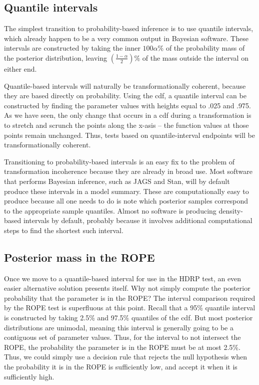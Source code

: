 \documentclass[man]{apa}
\newcommand{\hdr}{HDRP}
\begin{document}
\subsection*{Quantile intervals}

The simplest transition to probability-based inference is to use quantile intervals, which already happen to be a very common output in Bayesian software.  These intervals are constructed by taking the inner $100\alpha\%$ of the probability mass of the posterior distribution, leaving $\left(\frac{1-\alpha}{2}\right)\%$ of the mass outside the interval on either end. 

Quantile-based intervals will naturally be transformationally coherent, because they are based directly on probability. Using the cdf, a quantile interval can be constructed by finding the parameter values with heights equal to .025 and .975. As we have seen, the only change that occurs in a cdf during a transformation is to stretch and scrunch the points along the x-asis -- the function values at those points remain unchanged. Thus, tests based on quantile-interval endpoints will be transformationally coherent.

Transitioning to probability-based intervals is an easy fix to the problem of transformation incoherence because they are already in broad use. Most software that performs Bayesian inference, such as JAGS and Stan, will by default produce these intervals in a model summary. These are computationally easy to produce because all one needs to do is note which posterior samples correspond to the appropriate sample quantiles. Almost no software is producing density-based intervals by default, probably because it involves additional computational steps to find the shortest such interval.


\subsection*{Posterior mass in the ROPE}

Once we move to a quantile-based interval for use in the \hdr{} test, an even easier alternative solution presents itself. Why not simply compute the posterior probability that the parameter is in the ROPE? The interval comparison required by the ROPE test is superfluous at this point. Recall that a 95\% quantile interval is constructed by taking 2.5\% and 97.5\% quantiles of the cdf. But most posterior distributions are unimodal, meaning this interval is generally going to be a contiguous set of parameter values. Thus, for the interval to not intersect the ROPE, the probability the parameter is in the ROPE must be at most 2.5\%. Thus, we could simply use a decision rule that rejects the null hypothesis when the probability it is in the ROPE is sufficiently low, and accept it when it is sufficiently high. 
\end{document}
